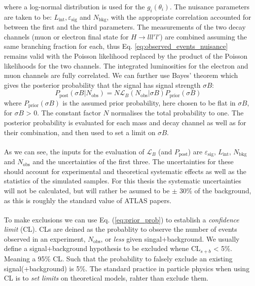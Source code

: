 \documentclass[12pt, a4paper]{book}
\begin{document}
where a log-normal distribution is used for the $g_i(\theta_i)$. The nuisance parameters are taken to be: $L_{\text{int}}, \varepsilon_{\text{sig}}$ and $N_{\text{bkg}}$, with the appropriate correlation accounted for between the first and the third parameters. The measurements of 
the two decay channels (muon or electron final state for $H\rightarrow lll'l'$) are combined assuming the same branching fraction for each, thus Eq. \ref{eq:observed_events_nuisance} remains valid with the Poisson likelihood replaced by the product of the Poisson likelihoods for the two channels. 
The integrated luminosities for the electron and muon channels are fully correlated. We can further use Bayes' theorem which gives the posterior probability that the signal has signal strength $\sigma B$:
\begin{equation}\label{eq:prior_prob}
    P_{\text{post}}(\sigma B\vert N_{\text{obs}}) = N \mathcal{L}_B (N_{\text{obs}}\vert\sigma B) P_{\text{prior}}(\sigma B)
\end{equation}
where $P_{\text{prior}}(\sigma B)$ is the assumed prior probability, here chosen to be flat in $\sigma B$, for $\sigma B$ > 0. The constant factor $N$ normalises the total probability to one. The posterior probability is evaluated for each mass and decay channel as well as for their 
combination, and then used to set a limit on $\sigma B$.\\
\\As we can see, the inputs for the evaluation of $\mathcal{L}_B$ (and $P_{\text{post}}$) are $\varepsilon_{\text{sig}}$, $L_{\text{int}}$, $N_{\text{bkg}}$ and $N_{\text{obs}}$ and the uncertainties of the first three. The uncertainties for these should account for experimental 
and theoretical systematic effects as well as the statistics of the simulated samples. For this thesis the systematic uncertainties will not be calculated, but will rather be asumed to be $\pm$ 30\% of the background, as this is roughly the standard value of ATLAS papers.\\
\\To make exclusions we can use Eq. (\ref{eq:prior_prob}) to establish a \textit{confidence limit} (CL). CLs are deined as the probablity to observe the number of events observed in an experiment, $N_{\text{obs}}$, or \textit{less} given singal+background. We usually define a signal+background 
hypothesis to be excluded whene CL$_{s+b}$ < 5\%. Meaning a 95\% CL. Such that the probability to falsely exclude an existing signal(+background) is 5\%. The standard practice in particle physics when using CL is to \textit{set limits} on theoretical models, rahter than exclude them.\\
\end{document}
